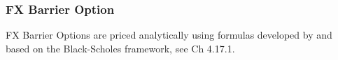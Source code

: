 \subsubsection{FX Barrier Option}
\label{pricing:fx_barrieroption}

FX Barrier Options are priced analytically using formulas developed by
\cite{Merton_1973} and \cite{Rubinstein_1991} based on the Black-Scholes framework, 
see \cite{Haug_1997} Ch 4.17.1.
